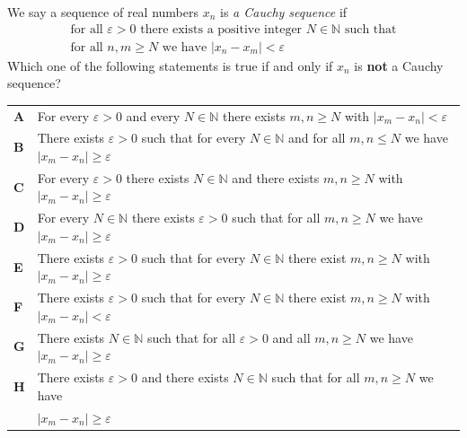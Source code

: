 \documentclass[11pt,a4paper]{article}
\begin{document}
\begin{enumerate}[label=\textbf{\arabic*.},leftmargin=*,itemsep=0pt,start=6]
\questionitem[Logic]
We say a sequence of real numbers $x_n$ is \textit{a Cauchy sequence} if
\[
\begin{array}{c}
\text{for all $\varepsilon>0$ there exists a positive integer $N \in\mathbb{N}$ such that} \\[2pt]
\text{for all $n,m \geq N$ we have $|x_n - x_m | < \varepsilon$}
\end{array}
\]
Which one of the following statements is true if and only if $x_n$ is \textbf{not} a Cauchy sequence?

\par\vspace*{12pt}
\begin{tabularx}{\linewidth}{@{}>{\bfseries}l Y@{}}
A &
For every $\varepsilon>0$ and every $N\in\mathbb{N}$ there exists $m,n\ge N$ with $|x_m-x_n|<\varepsilon$
\\[0.8em]
B &
There exists $\varepsilon>0$ such that for every $N\in\mathbb{N}$ and for all $m,n\le N$ we have $|x_m-x_n|\ge \varepsilon$
\\[0.8em]
C &
For every $\varepsilon>0$ there exists $N\in\mathbb{N}$ and there exists $m,n\ge N$ with $|x_m-x_n|\ge \varepsilon$
\\[0.8em]
D &
For every $N\in\mathbb{N}$ there exists $\varepsilon>0$ such that for all $m,n\ge N$ we have $|x_m-x_n|\ge \varepsilon$
\\[0.8em]
E &
There exists $\varepsilon>0$ such that for every $N\in\mathbb{N}$ there exist $m,n\ge N$ with $|x_m-x_n|\ge \varepsilon$
\\[0.8em]
F &
There exists $\varepsilon>0$ such that for every $N\in\mathbb{N}$ there exist $m,n\ge N$ with $|x_m-x_n|<\varepsilon$
\\[0.8em]
G &
There exists $N\in\mathbb{N}$ such that for all $\varepsilon>0$ and all $m,n\ge N$ we have $|x_m-x_n|\ge \varepsilon$
\\[0.8em]
H &
There exists $\varepsilon>0$ and there exists $N\in\mathbb{N}$ such that for all $m,n\ge N$ we have \\&$|x_m-x_n|\ge \varepsilon$
\\
\end{tabularx}


\end{enumerate}
\end{document}

